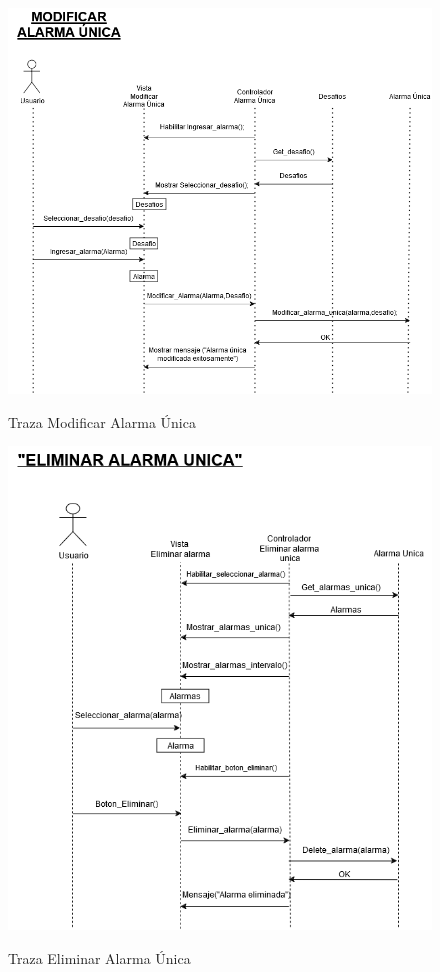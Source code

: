 \begin{figure}[H]
	\centering
	\caption{Traza Modificar Alarma Única}
	\includegraphics[width=\textwidth]{./img/Modificar_Alarma_Unica.png}
        \vspace{10pt}
	\label{fig:Traza Modificar Alarma Única}
\end{figure}

\begin{figure}[H]
	\centering
	\caption{Traza Eliminar Alarma Única}
	\includegraphics[width=\textwidth]{./img/Eliminar_Alarma_Unica.png}
        \vspace{10pt}
	\label{fig:Traza Eliminar Alarma Única}
\end{figure}


